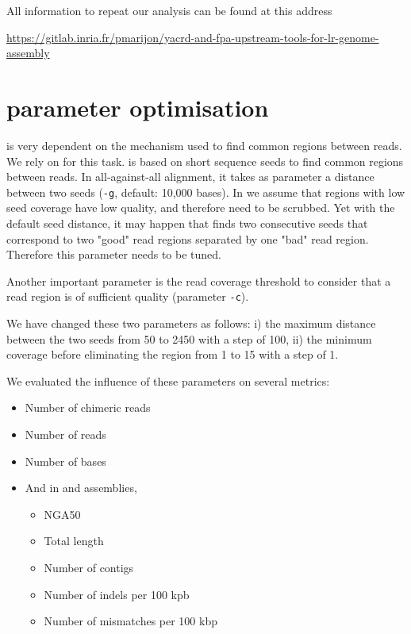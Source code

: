 \documentclass[../../main.tex]{subfiles}
\begin{document}
All information to repeat our analysis can be found at this address

\url{https://gitlab.inria.fr/pmarijon/yacrd-and-fpa-upstream-tools-for-lr-genome-assembly}



\newpage
\section{\yacrd parameter optimisation}\label{appendix:yacrd_parameter_optimisation}

\yacrd is very dependent on the mechanism used to find common regions between reads. We rely on \minimap for this task. \minimap is based on short sequence seeds to find common regions between reads. In all-against-all alignment, it takes as parameter a distance between two seeds (\texttt{-g}, default: 10,000 bases). In \yacrd we assume that regions with low seed coverage have low quality, and therefore need to be scrubbed. Yet with the default seed distance, it may happen that \minimap finds two consecutive seeds that correspond to two "good" read regions separated by one "bad" read region. Therefore this parameter needs to be tuned.

Another important parameter is the read coverage threshold to consider that a read region is of sufficient quality (\yacrd parameter \texttt{-c}).

We have changed these two parameters as follows: i) the maximum distance between the two seeds from 50 to 2450 with a step of 100, ii) the minimum coverage before eliminating the region from 1 to 15 with a step of 1.

We evaluated the influence of these parameters on several metrics:
\begin{itemize}
    \item Number of chimeric reads
    \item Number of reads
    \item Number of bases
    \item And in \miniasm and \wtdbg assemblies,
    \begin{itemize}
        \item NGA50
        \item Total length
        \item Number of contigs
        \item Number of indels per 100 kpb
        \item Number of mismatches per 100 kbp
    \end{itemize}
\end{itemize}
\end{document}
